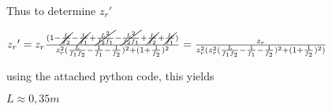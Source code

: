 \documentclass{article}
\begin{document}
 Thus to determine ${z_r}'$
 
 ${z_r}'=z_r\frac{(1-\cancel{\frac{L}{f_2}}-\cancel{\frac{L}{f_1}}+\cancel{\frac{L^2}{f_2 f_1}}-\cancel{\frac{L^2}{f_2 f_1}}+\cancel{\frac{L}{f_2}}+\cancel{\frac{L}{f_1}})}{z_r^2(\frac{L}{f_1 f_2}-\frac{1}{f_1}-\frac{1}{f_2})^2+(1+\frac{1}{f_2})^2}=\frac{z_r}{z_r^2(z_r^2(\frac{L}{f_1 f_2}-\frac{1}{f_1}-\frac{1}{f_2})^2+(1+\frac{1}{f_2})^2)} 
 $
 
 using the attached python code, this yields
 
 $L \approx 0,35 m$
\end{document}
